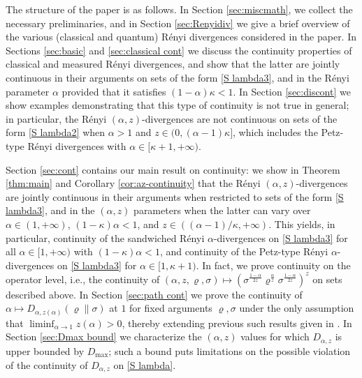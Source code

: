 \documentclass[unsortedaddress,superscriptaddress,pra,notitlepage]{revtex4}
\def\rho{\varrho}
\def\pwr{\kappa}
\begin{document}
The structure of the paper is as follows. 
In Section \ref{sec:miscmath}, we collect the necessary preliminaries, and in Section 
\ref{sec:Renyidiv} we give a brief overview of the various (classical and quantum) R\'enyi divergences considered in the paper.  
In Sections \ref{sec:basic} and \ref{sec:classical cont}
we discuss the continuity properties of classical and measured R\'enyi divergences,
and show that the latter are jointly continuous in their arguments on sets of the form 
\eqref{S lambda3}, 
and in the R\'enyi parameter $\alpha$ provided that it satisfies 
$(1-\alpha)\pwr<1$.
In Section \ref{sec:discont} we show examples demonstrating that this type of continuity is not true in general; in particular, the R\'enyi $(\alpha,z)$-divergences are not continuous on 
sets of the form \eqref{S lambda2} when $\alpha>1$ and $z\in(0,(\alpha-1)\pwr]$, which includes the
Petz-type R\'enyi divergences with $\alpha\in[\pwr+1,+\infty)$.

Section \ref{sec:cont} contains our main result on continuity: we show in 
Theorem \ref{thm:main} and Corollary \ref{cor:az-continuity} that the R\'enyi $(\alpha,z)$-divergences are jointly continuous in their arguments when restricted to sets of the form 
\eqref{S lambda3}, and in the $(\alpha,z)$ parameters when the latter can vary over 
$\alpha\in(1,+\infty)$, $(1-\pwr)\alpha<1$, and 
$z\in((\alpha-1)/\pwr,+\infty)$. 
This yields, in particular, 
continuity of the sandwiched R\'enyi $\alpha$-divergences 
on \eqref{S lambda3}
for all $\alpha\in[1,+\infty)$
with $(1-\pwr)\alpha<1$, and
continuity of the Petz-type R\'enyi $\alpha$-divergences 
on \eqref{S lambda3}
for $\alpha\in[1,\pwr+1)$.
In fact, we 
prove continuity on the operator level, i.e., the continuity of 
$(\alpha,z,\rho,\sigma)\mapsto 
(\sigma^{\frac{1-\alpha}{2z}}
\rho^{\frac{\alpha}{z}}\sigma^{\frac{1-\alpha}{2z}})^z$ on sets described above.
In Section \ref{sec:path cont} we prove the continuity of 
$\alpha\mapsto D_{\alpha,z(\alpha)}(\rho\|\sigma)$ at $1$ for fixed arguments $\rho,\sigma$
under the only assumption that $\liminf_{\alpha\to 1}z(\alpha)>0$, thereby extending 
previous such results given in \cite{LinTomamichel15}.
In Section \ref{sec:Dmax bound} we characterize the $(\alpha,z)$ values for which 
$D_{\alpha,z}$ is upper bounded by $D_{\max}$; such a bound puts limitations on the 
possible violation of the continuity of $D_{\alpha,z}$ on \eqref{S lambda}.
\end{document}
